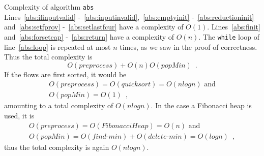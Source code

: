 \begin{sepproof}{Complexity of algorithm \texttt{abs}} \ \\
  Lines~\ref{abs:ifinputvalid} -~\ref{abs:inputinvalid},~\ref{abs:emptyinit} -~\ref{abs:reductioninit} and~\ref{abs:setfprov}
  -~\ref{abs:setlastfcur} have a complexity of $O\left(1\right)$. Lines~\ref{abs:finit} and~\ref{abs:forsetcap}
  -~\ref{abs:return} have a complexity of $O\left(n\right)$. The \texttt{while} loop of line~\ref{abs:loop} is repeated at
  most $n$ times, as we saw in the proof of correctness. Thus the total complexity is
  \begin{equation*}
    O\left(preprocess\right) + O\left(n\right)O\left(popMin\right) \enspace.
  \end{equation*}
  If the flows are first sorted, it would be
  \begin{equation*}
  \begin{gathered}
    O\left(preprocess\right) = O\left(quicksort\right) = O\left(nlogn\right) \mbox{ and} \\
    O\left(popMin\right) = O\left(1\right) \enspace,
  \end{gathered}
  \end{equation*}
  amounting to a total complexity of $O\left(nlogn\right)$. In the case a Fibonacci heap is used, it is
  \begin{equation*}
  \begin{gathered}
    O\left(preprocess\right) = O\left(FibonacciHeap\right) = O\left(n\right) \mbox{ and} \\
    O\left(popMin\right) = O\left(find\mbox{-}min\right) + O\left(delete\mbox{-}min\right) = O\left(logn\right) \enspace,
  \end{gathered}
  \end{equation*}
  thus the total complexity is again $O\left(nlogn\right)$.
\end{sepproof}

